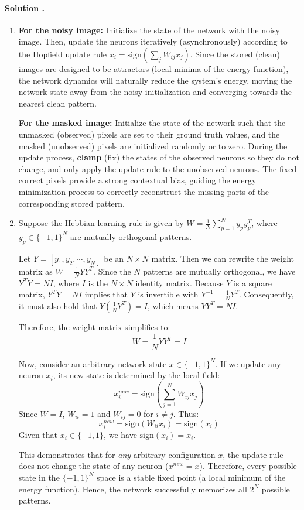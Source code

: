 \documentclass{article}
\newcounter{solutionCount}
\newcommand{\solution}[1]{
    \stepcounter{solutionCount}
    \paragraph{Solution \thesolutionCount.}
    {
        #1
    }
}
\begin{document}
\solution{
    \begin{enumerate}
        \item 
        \textbf{For the noisy image:} Initialize the state of the network with the noisy image. Then, update the neurons iteratively (asynchronously) according to the Hopfield update rule $x_i = \text{sign}(\sum_{j} W_{ij} x_j)$. Since the stored (clean) images are designed to be attractors (local minima of the energy function), the network dynamics will naturally reduce the system's energy, moving the network state away from the noisy initialization and converging towards the nearest clean pattern.
        
        \textbf{For the masked image:} Initialize the state of the network such that the unmasked (observed) pixels are set to their ground truth values, and the masked (unobserved) pixels are initialized randomly or to zero. During the update process, \textbf{clamp} (fix) the states of the observed neurons so they do not change, and only apply the update rule to the unobserved neurons. The fixed correct pixels provide a strong contextual bias, guiding the energy minimization process to correctly reconstruct the missing parts of the corresponding stored pattern.

        \item 
        Suppose the Hebbian learning rule is given by $W = \frac{1}{N}\sum_{p=1}^N y_p y_p^T$, where $y_p \in \{-1, 1\}^N$ are mutually orthogonal patterns. 
        
        Let $Y = [y_1, y_2, \cdots, y_N]$ be an $N \times N$ matrix. Then we can rewrite the weight matrix as $W = \frac{1}{N} Y Y^T$. 
        Since the $N$ patterns are mutually orthogonal, we have $Y^T Y = N I$, where $I$ is the $N \times N$ identity matrix. Because $Y$ is a square matrix, $Y^T Y = N I$ implies that $Y$ is invertible with $Y^{-1} = \frac{1}{N} Y^T$. Consequently, it must also hold that $Y (\frac{1}{N} Y^T) = I$, which means $Y Y^T = N I$. 
        
        Therefore, the weight matrix simplifies to:
        $$W = \frac{1}{N} Y Y^T = I$$
        
        Now, consider an arbitrary network state $x \in \{-1, 1\}^N$. If we update any neuron $x_i$, its new state is determined by the local field:
        $$x_i^{new} = \text{sign}\left(\sum_{j=1}^N W_{ij} x_j\right)$$
        Since $W = I$, $W_{ii} = 1$ and $W_{ij} = 0$ for $i \neq j$. Thus:
        $$x_i^{new} = \text{sign}(W_{ii} x_i) = \text{sign}(x_i)$$
        Given that $x_i \in \{-1, 1\}$, we have $\text{sign}(x_i) = x_i$. 
        
        This demonstrates that for \textit{any} arbitrary configuration $x$, the update rule does not change the state of any neuron ($x^{new} = x$). Therefore, every possible state in the $\{-1, 1\}^N$ space is a stable fixed point (a local minimum of the energy function). Hence, the network successfully memorizes all $2^N$ possible patterns.
    \end{enumerate}
}
\end{document}
